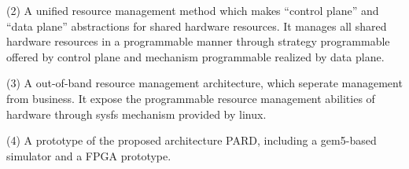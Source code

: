 \begin{eabstract}
  (2) A unified resource management method which makes ``control plane'' and
      ``data plane'' abstractions for shared hardware resources.
      It manages all shared hardware resources in a programmable manner through
      strategy programmable offered by control plane and
      mechanism programmable realized by data plane.

  (3) A out-of-band resource management architecture,
      which seperate management from business.
      It expose the programmable resource management abilities of hardware through
      sysfs mechanism provided by linux.

  (4) A prototype of the proposed architecture PARD, including a gem5-based simulator
      and a FPGA prototype.
      

\end{eabstract}


